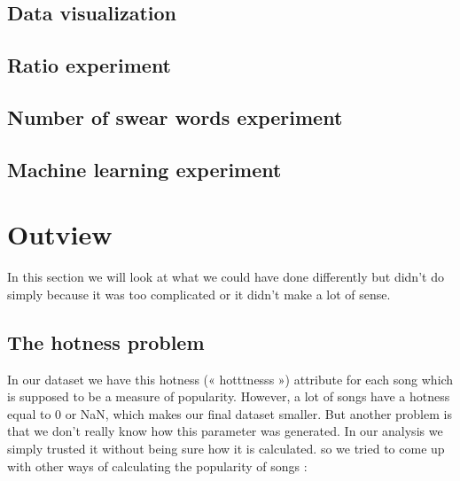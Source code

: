 \documentclass[11pt]{article}
\begin{document}
\subsection{Data visualization}

\subsection{Ratio experiment}

\subsection{Number of swear words experiment}

\subsection{Machine learning experiment}


\section{Outview}
In this section we will look at what we could have done differently but didn’t do simply because it was
too complicated or it didn’t make a lot of sense.

\subsection{The hotness problem}
In our dataset we have this hotness (« hotttnesss ») attribute for each song which is
supposed to be a measure of popularity. However, a lot of songs have a hotness equal to 0 or NaN, which
makes our final dataset smaller. But another problem is that we don’t really know how this parameter was
generated. In our analysis we simply trusted it without being sure how it is calculated.
so we tried to come up with other ways of calculating the popularity of songs :
\end{document}
